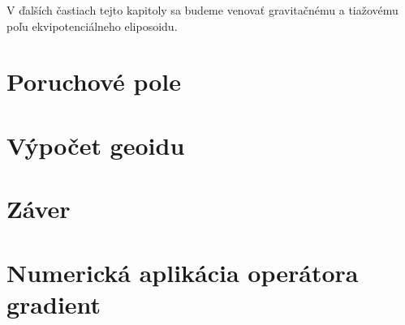 \documentclass[a4paper,12pt]{book}
\begin{document}
V ďalších častiach tejto kapitoly sa budeme venovať gravitačnému a tiažovému 
poľu ekvipotenciálneho eliposoidu.









\chapter{Poruchové pole}
\label{sec:disturbing_field}








\chapter{Výpočet geoidu}
\label{sec:geoid_determination}







\chapter*{Záver}







\appendix
\chapter{Numerická aplikácia operátora gradient}
\label{app:numerical_application_of_gradient}
\end{document}
